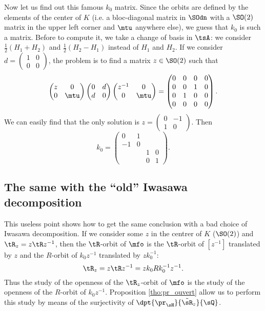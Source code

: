 Now let us find out this famous $k_0$ matrix. Since the orbits are defined by the elements of the center of $K$ (i.e. a bloc-diagonal matrix in $\SOdn$ with a $\SO(2)$ matrix in the upper left corner and $\mtu$ anywhere else), we guess that $k_0$ is such a matrix. Before to compute it, we take a change of basis in $\tsA$: we consider $\frac{1}{2}(H_1+H_2)$ and $\frac{1}{2}(H_2-H_1)$ instead of $H_1$ and $H_2$. If we consider $d=\begin{pmatrix} 1&0\\0&0 \end{pmatrix}$, the problem is to find a matrix $z\in \SO(2)$ such that
\[
   \begin{pmatrix}
     z&0\\
     0&\mtu
   \end{pmatrix}
   \begin{pmatrix}
     0&d\\
     d&0
   \end{pmatrix}
   \begin{pmatrix}
     z^{-1}&0\\
     0&\mtu
   \end{pmatrix}
   =
   \begin{pmatrix}
    0&0&0&0\\
    0&0&1&0\\
    0&1&0&0\\
    0&0&0&0
   \end{pmatrix}.
\]
We can easily find that the only solution is 
$z=\begin{pmatrix}
     0&-1\\
     1&0
   \end{pmatrix}$.
Then
\begin{equation}
  k_0=
  \begin{pmatrix}
    0 &1&&\\
    -1&0&&\\
    &&1&0\\
    &&0&1
   \end{pmatrix}.
\end{equation}
  
\subsection{The same with the  ``old'' Iwasawa decomposition}

This useless point shows how to get the same conclusion with a bad choice of Iwasawa decomposition. If we consider some $z$ in the centrer of $K$ ($\SO(2)$) and $\tR_z=z\tR z^{-1}$, then the $\tR$-orbit of $\mfo$ is the $\tR$-orbit of $[z^{-1}]$ translated by $z$ and the $R$-orbit of $k_0z^{-1}$ translated by $zk_0^{-1}$:
\begin{equation}
   \tR_z=z\tR z^{-1}=zk_0 Rk_0^{-1} z^{-1}.
\end{equation}
Thus the study of the openness of the $\tR_z$-orbit of $\mfo$ is the study of the openness of the $R$-orbit of $k_0z^{-1}$. Proposition \ref{tho:pr_ouvert} allow us to perform this study by means of the surjectivity of $\dpt{\pr_{\sH}}{\tilde{\sR}_z}{\sQ}$. 

